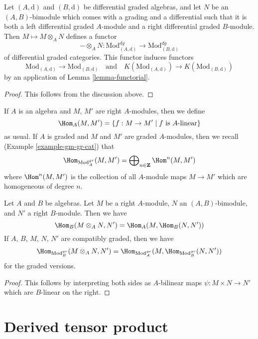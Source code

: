 \begin{lemma}
\label{lemma-tensor}
Let $(A, \text{d})$ and $(B, \text{d})$ be differential graded algebras,
and let $N$ be an $(A, B)$-bimodule which comes with a grading and a
differential such that it is both a left differential graded $A$-module
and a right differential graded $B$-module. Then
$M \mapsto M \otimes_A N$ defines a functor
$$
- \otimes_A N :
\text{Mod}^{dg}_{(A, \text{d})}
\longrightarrow
\text{Mod}^{dg}_{(B, \text{d})}
$$
of differential graded categories. This functor induces functors
$$
\text{Mod}_{(A, \text{d})} \to \text{Mod}_{(B, \text{d})}
\quad\text{and}\quad
K(\text{Mod}_{(A, \text{d})}) \to K(\text{Mod}_{(B, \text{d})})
$$
by an application of Lemma \ref{lemma-functorial}.
\end{lemma}

\begin{proof}
This follows from the discussion above.
\end{proof}

\noindent
If $A$ is an algebra and $M$, $M'$ are right $A$-modules, then we
define
$$
\Hom_A(M, M') = \{f : M \to M'\mid f \text{ is }A\text{-linear}\}
$$
as usual. If $A$ is graded and $M$ and $M'$ are graded $A$-modules,
then we recall (Example \ref{example-gm-gr-cat}) that
$$
\Hom_{\text{Mod}_A^{gr}}(M, M') =
\bigoplus\nolimits_{n \in \mathbf{Z}} \Hom^n(M, M')
$$
where $\Hom^n(M, M')$ is the collection of all $A$-module maps
$M \to M'$ which are homogeneous of degree $n$.

\begin{lemma}
\label{lemma-tensor-hom-adjunction}
Let $A$ and $B$ be algebras. Let $M$ be a right $A$-module, $N$ an
$(A, B)$-bimodule, and $N'$ a right $B$-module. Then we have
$$
\Hom_B(M \otimes_A N, N') = \Hom_A(M, \Hom_B(N, N'))
$$
If $A$, $B$, $M$, $N$, $N'$ are compatibly graded, then we have
$$
\Hom_{\text{Mod}_B^{gr}}(M \otimes_A N, N') =
\Hom_{\text{Mod}_A^{gr}}(M, \Hom_{\text{Mod}_B^{gr}}(N, N'))
$$
for the graded versions.
\end{lemma}

\begin{proof}
This follows by interpreting both sides as $A$-bilinear maps
$\psi : M \times N \to N'$ which are $B$-linear on the right.
\end{proof}





\section{Derived tensor product}
\label{section-base-change}

